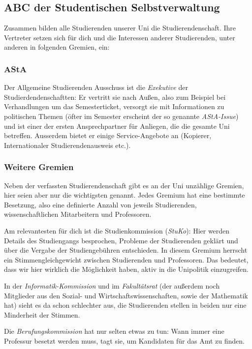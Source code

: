 	\subsection{ABC der Studentischen Selbstverwaltung}
	Zusammen bilden alle Studierenden unserer Uni die Studierendenschaft. Ihre Vertreter setzen sich für dich und die
	Interessen anderer Studierenden, unter anderen in folgenden
	Gremien, ein:

	\subsubsection*{AStA}
		Der Allgemeine Studierenden Ausschuss ist die
		\emph{Exekutive} der Studierdendenschaftten: Er vertritt
		sie nach Außen, also zum Beispiel bei Verhandlungen um
		das Semesterticket, versorgt sie mit Informationen zu
		politischen Themen (öfter im Semester erscheint der so
		genannte \emph{AStA-Issue}) und ist einer der ersten
		Ansprechpartner für  Anliegen, die die gesamte Uni
		betreffen. Ausserdem bietet er einige Service-Angebote
		an (Kopierer, Internationaler Studierendenausweis etc.).

		\subsubsection*{Weitere Gremien}
		Neben der verfassten Studierendenschaft gibt es an der Uni  unzählige Gremien, hier seien aber nur die wichtigsten genannt. Jedes Gremium hat eine bestimmte Besetzung, also eine definierte Anzahl von jeweils Studierenden, wissenschaftlichen Mitarbeitern und Professoren.

		Am relevantesten für dich ist die Studienkommission (\emph{StuKo}): Hier werden Details des Studiengangs besprochen, Probleme der Studierenden geklärt und über die Vergabe der Studiengebühren entschieden. In diesem Gremium herrscht ein Stimmengleichgewicht zwischen Studierenden und Professoren. Das bedeutet, dass wir hier wirklich die Möglichkeit haben, aktiv in die Unipolitik einzugreifen.

		In der \emph{Informatik-Kommission} und im
		\emph{Fakultätsrat} (der außerdem noch Mitglieder aus
		den Sozial- und Wirtschaftswissenschaften, sowie der Mathematik hat) sieht es da schon schlechter aus, die Studierenden stellen in beiden nur eine Minderheit der Stimmen.

		Die \emph{Berufungskommission} hat nur selten etwas zu tun: Wann immer eine Professur besetzt werden muss, tagt sie, um Kandidaten für das Amt zu finden.

